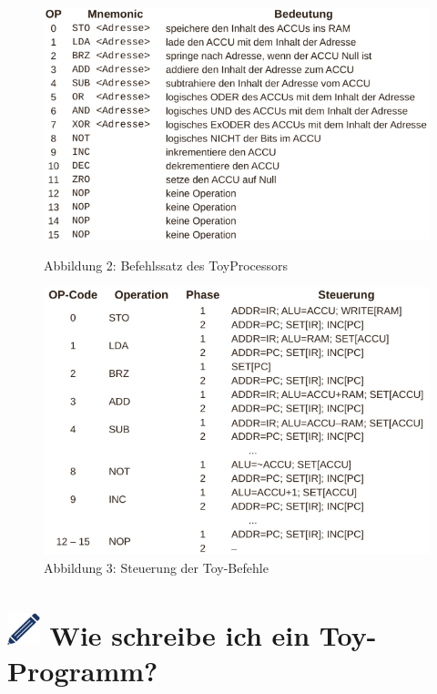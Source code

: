 \documentclass{article}
\begin{document}
\begin{figure}[h!]
    \centering
    \begin{minipage}{0.49\textwidth}
        \centering
        \includegraphics[height=0.6\linewidth]{./picture_befehlssatz.png}
        \caption*{Abbildung 2: Befehlssatz des ToyProcessors}
    \end{minipage}
    \begin{minipage}{0.49\textwidth}
        \centering
        \includegraphics[height=0.6\linewidth]{./picture_steuerung.png}
        \caption*{Abbildung 3: Steuerung der Toy-Befehle}
    \end{minipage}
\end{figure}

\section*{\includegraphics[width=0.95cm]{./icon_stift.png}
\hspace{0.25cm} Wie schreibe ich ein Toy-Programm?}
\end{document}
